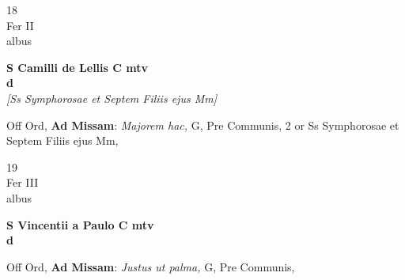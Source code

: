 \documentclass[10pt, openany]{book}
\begin{document}
        \begin{center}
            \begin{minipage}{3.5in}
                \vspace{2em}
                \begin{minipage}{0.5in}
                    {\Huge 18} \\
                    {\normalsize Fer II} \\
                    {\normalsize albus}
                \end{minipage}
                \begin{minipage}{3.0in}
                    \textbf{ \large S Camilli de Lellis C mtv \\
                    \textnormal{\normalsize d}} \\ \textit{[Ss Symphorosae et Septem Filiis ejus Mm]} \\ 
                \end{minipage}
                \begin{justify}Off Ord, \textbf{Ad Missam}: \textit{Majorem hac,} G, Pre Communis, 2 or Ss Symphorosae et Septem Filiis ejus Mm,  
                \end{justify}
            \end{minipage}
        \end{center}
    
        \begin{center}
            \begin{minipage}{3.5in}
                \vspace{2em}
                \begin{minipage}{0.5in}
                    {\Huge 19} \\
                    {\normalsize Fer III} \\
                    {\normalsize albus}
                \end{minipage}
                \begin{minipage}{3.0in}
                    \textbf{ \large S Vincentii a Paulo C mtv \\
                    \textnormal{\normalsize d}} \\ 
                \end{minipage}
                \begin{justify}Off Ord, \textbf{Ad Missam}: \textit{Justus ut palma,} G, Pre Communis,  
                \end{justify}
            \end{minipage}
        \end{center}
    
\end{document}
